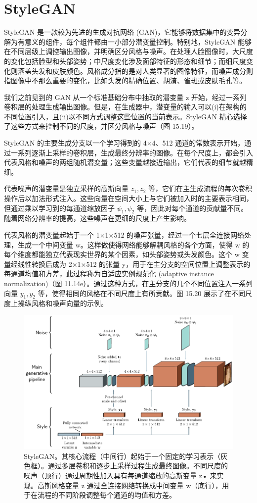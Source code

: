 \documentclass[lang=cn,newtx,10pt,scheme=chinese]{elegantbook}
\begin{document}
\section{StyleGAN}
StyleGAN 是一款较为先进的生成对抗网络 (GAN)，它能够将数据集中的变异分解为有意义的组件，每个组件都由一小部分潜变量控制。特别地，StyleGAN 能够在不同层级上调控输出图像，并明确区分风格与噪声。在处理人脸图像时，大尺度的变化包括脸型和头部姿势；中尺度变化涉及面部特征的形态和细节；而细尺度变化则涵盖头发和皮肤颜色。风格成分指的是对人类显著的图像特征，而噪声成分则指图像中不那么重要的变化，比如头发的精确位置、胡渣、雀斑或皮肤毛孔等。

我们之前见到的 GAN 从一个标准基础分布中抽取的潜变量 z 开始，经过一系列卷积层的处理生成输出图像。但是，在生成器中，潜变量的输入可以(i)在架构的不同位置引入，且(ii)以不同方式调整这些位置的当前表示。StyleGAN 精心选择了这些方式来控制不同的尺度，并区分风格与噪声（图 15.19）。

StyleGAN 的主要生成分支以一个学习得到的 4×4、512 通道的常数表示开始，通过一系列逐渐上采样的卷积层，生成最终分辨率的图像。在每个尺度上，都会引入代表风格和噪声的两组随机潜变量；这些变量越接近输出，它们代表的细节就越精细。

代表噪声的潜变量是独立采样的高斯向量 \(z_1, z_2\) 等，它们在主生成流程的每次卷积操作后以加法形式注入。这些向量在空间大小上与它们被加入时的主要表示相同，但通过乘以学习到的每通道缩放因子 \(\psi_1, \psi_2\) 等，因此对每个通道的贡献量不同。随着网络分辨率的提高，这些噪声在更细的尺度上产生影响。

代表风格的潜变量起始于一个 1×1×512 的噪声张量，经过一个七层全连接网络处理，生成一个中间变量 w。这样做使得网络能够解耦风格的各个方面，使得 w 的每个维度都能独立代表现实世界的某个因素，如头部姿势或头发颜色。这个 w 变量经线性转换后成为 2×1×512 的张量 y，用于在主分支的空间位置上调整表示的每通道均值和方差，此过程称为自适应实例规范化 (adaptive instance normalization)（图 11.14e）。通过这种方式，在主分支的几个不同位置注入一系列向量 \(y_1, y_2\) 等，使得相同的风格在不同尺度上有所贡献。图 15.20 展示了在不同尺度上操纵风格和噪声向量的示例。

\begin{figure}[ht!]
\centering
\includegraphics[width=0.7\linewidth]{PDFFigures/UDLChap15PDF/GanStyleGANArch.pdf}
\caption{StyleGAN。其核心流程（中间行）起始于一个固定的学习表示（灰色框）。通过多层卷积和逐步上采样过程生成最终图像。不同尺度的噪声（顶行）通过周期性加入具有每通道缩放的高斯变量 z• 来实现。高斯风格变量 z 通过全连接网络转换成中间变量 w（底行），用于在流程的不同阶段调整每个通道的均值和方差。}
\end{figure}
\end{document}
